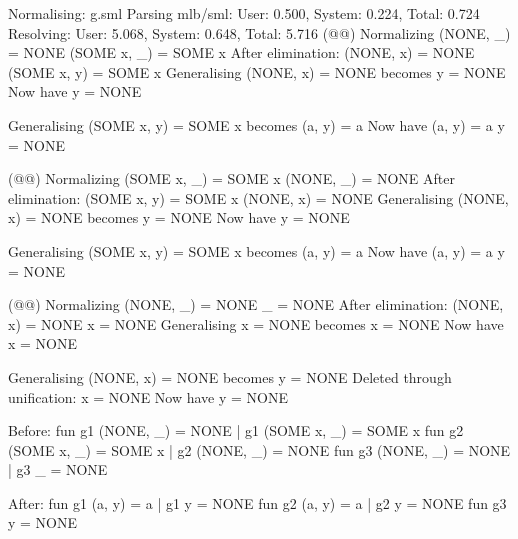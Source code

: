 \begin{example}[]
\begin{narrow}{-3em}{0em}
    \begin{multicols}{2}           
      \begin{sml}
Normalising: g.sml
Parsing mlb/sml: 
  User: 0.500, System: 0.224, Total: 0.724
Resolving: 
  User: 5.068, System: 0.648, Total: 5.716
(@@)
Normalizing
  (NONE, _) = NONE
  (SOME x, _) = SOME x
After elimination:
  (NONE, x) = NONE
  (SOME x, y) = SOME x
Generalising
  (NONE, x) = NONE
becomes
  y = NONE
Now have
  y = NONE

Generalising
  (SOME x, y) = SOME x
becomes
  (a, y) = a
Now have
  (a, y) = a
  y = NONE

(@@)
Normalizing
  (SOME x, _) = SOME x
  (NONE, _) = NONE
After elimination:
  (SOME x, y) = SOME x
  (NONE, x) = NONE
Generalising
  (NONE, x) = NONE
becomes
  y = NONE
Now have
  y = NONE

Generalising
  (SOME x, y) = SOME x
becomes
  (a, y) = a
Now have
  (a, y) = a
  y = NONE

(@@)
Normalizing
  (NONE, _) = NONE
  _ = NONE
After elimination:
  (NONE, x) = NONE
  x = NONE
Generalising
  x = NONE
becomes
  x = NONE
Now have
  x = NONE

Generalising
  (NONE, x) = NONE
becomes
  y = NONE
Deleted through unification:
  x = NONE
Now have
  y = NONE

Before:
fun g1 (NONE, _) = NONE
  | g1 (SOME x, _) = SOME x
fun g2 (SOME x, _) = SOME x
  | g2 (NONE, _) = NONE
fun g3 (NONE, _) = NONE
  | g3 _ = NONE

After:
fun g1 (a, y) = a
  | g1 y = NONE
fun g2 (a, y) = a
  | g2 y = NONE
fun g3 y = NONE
      \end{sml}
    \end{multicols}
  \end{narrow}
\end{example}

